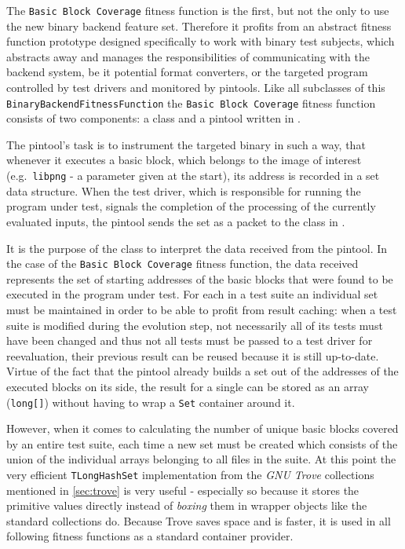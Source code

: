 The \texttt{Basic Block Coverage} fitness function is the first, but not the only to use the new binary 
backend feature set. Therefore it profits from an abstract fitness function prototype designed specifically 
to work with binary test subjects, which abstracts away and manages the responsibilities of communicating 
with the backend system, be it potential format converters, or the targeted program controlled by test 
drivers and monitored by pintools.
Like all subclasses of this \texttt{BinaryBackendFitnessFunction} the \texttt{Basic Block Coverage} 
fitness function consists of two components: a \java class and a pintool written in \cpp.

The pintool's task is to instrument the targeted binary in such a way, that whenever it executes a 
basic block, which belongs to the image of interest (e.g.\ \texttt{libpng} - a parameter given at the start),
its address is recorded in a set data structure. When the test driver, which is responsible for running 
the program under test, signals the completion of the processing of the currently evaluated inputs, 
the pintool sends the set as a packet to the \java class in \xmlmate.

It is the purpose of the \java class to interpret the data received from the pintool.
In the case of the \texttt{Basic Block Coverage} fitness function, the data received represents the
set of starting addresses of the basic blocks that were found to be executed in the program under test. 
For each \xml in a test suite an individual set must be maintained in order to be able to profit 
from result caching: when a test suite is modified during the evolution step, not necessarily all
of its tests must have been changed and thus not all tests must be passed to a test driver for reevaluation, 
their previous result can be reused because it is still up-to-date. Virtue of the fact that the pintool 
already builds a set out of the addresses of the executed blocks on its side, the result for a single 
\xml can be stored as an array (\texttt{long[]}) without having to wrap a \texttt{Set} container around it.

However, when it comes to calculating the number of unique basic blocks covered by an 
entire test suite, each time a new set must be created which consists of the union of 
the individual arrays belonging to all \xml files in the suite. At this point the very efficient
\texttt{TLongHashSet} implementation from the \emph{GNU Trove} collections mentioned in \cref{sec:trove} 
is very useful - especially so because it stores the \java primitive values directly instead of \emph{boxing}
them in wrapper objects like the standard \java collections do. Because Trove saves space and is faster, it is
used in all following fitness functions as a standard container provider.

